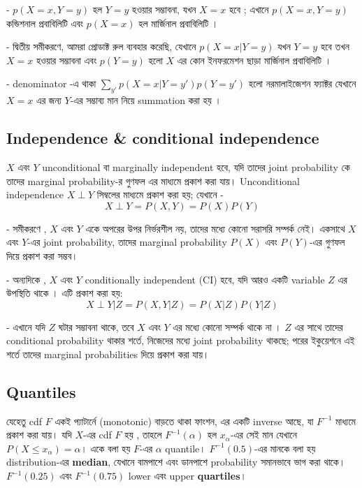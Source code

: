 \documentclass[graybox, envcountchap, twocolumn]{styles/svmult}
\begin{document}
-   {\bengalifont 
    \(p(X=x, Y=y)\) হল \(Y=y\) হওয়ার সম্ভাবনা, যখন \(X=x\) হবে ; এখানে \(p(X=x, Y=y)\)  কন্ডিশনাল প্রবাবিলিটি  এবং \(p(X=x)\) হল মার্জিনাল প্রবাবিলিটি ।  
    }

-    {\bengalifont 
    দ্বিতীয় সমীকরণে, আমরা প্রোডাক্ট রুল ব্যবহার করেছি, যেখানে \(p(X=x|Y=y)\) যখন  \(Y=y\) হবে তখন \(X=x\) হওয়ার সম্ভাবনা এবং \(p(Y=y)\) হলো $X$ এর কোন ইনফরমেশন ছাড়া  মার্জিনাল প্রবাবিলিটি ।
    }

-   {\bengalifont 
    denominator -এ থাকা \(\sum_{y'} p(X=x|Y=y') p(Y=y')\) হলো নরমালাইজেশন ফ্যাক্টর যেখানে $X = x$ এর জন্য  \(Y\)-এর সম্ভাব্য মান নিয়ে summation করা হয় । 
    }



\subsection{Independence \& conditional independence}
{\bengalifont 
\(X\) এবং \(Y\) unconditional বা marginally independent হবে, যদি তাদের joint probability কে তাদের marginal probability-র গুণফল এর মাধ্যমে প্রকাশ করা যায়। Unconditional independence \(X \perp Y\) সিম্বলের মাধ্যমে প্রকাশ করা হয়; যেখানে - }
\begin{equation}
X \perp Y = P(X,Y) = P(X)P(Y)
\end{equation}

-   {\bengalifont সমীকরণে , \(X\) এবং \(Y\) একে অপরের উপর নির্ভরশীল নয়, তাদের মধ্যে কোনো সরাসরি  সম্পর্ক নেই। একসাথে \(X\) এবং \(Y\)-এর joint probability, তাদের marginal probability \(P(X)\) এবং \(P(Y)\)-এর গুণফল দিয়ে প্রকাশ করা সম্ভব। }

-   {\bengalifont 
অন্যদিকে , \(X\) এবং \(Y\) conditionally independent (CI) হবে, যদি আরও একটি variable \(Z\) এর উপস্থিতি থাকে । এটি প্রকাশ করা হয়:}
\begin{equation}
X \perp Y|Z = P(X,Y|Z) = P(X|Z)P(Y|Z)
\end{equation}

-   {\bengalifont এখানে যদি \(Z\) ঘটার সম্ভাবনা থাকে, তবে  \(X\) এবং \(Y\) এর মধ্যে কোনো সম্পর্ক থাকে না । \(Z\) এর সাথে তাদের conditional probability থাকার শর্তে, নিজেদের মধ্যে joint probability থাকছে;  পরের ইকুয়েশনে এই শর্তে তাদের marginal probabilities দিয়ে প্রকাশ করা যায়। }


\subsection{Quantiles}
\bengalifont 
যেহেতু cdf \(F\) একই প্যাটার্নে (monotonic) বাড়তে থাকা ফাংশন, এর একটি inverse আছে, যা \(F^{-1}\) মাধ্যমে প্রকাশ করা যায়। যদি \(X\)-এর cdf \(F\) হয় , তাহলে \(F^{-1}(\alpha)\) হল \(x_{\alpha}\)-এর সেই মান যেখানে \(P(X \leq x_{\alpha}) = \alpha\)। একে বলা হয় \(F\)-এর \(\alpha\) quantile। \(F^{-1}(0.5)\)-এর মানকে বলা হয় distribution-এর \textbf{median}, যেখানে বামপাশে এবং ডানপাশে probability সমানভাবে ভাগ করা থাকে। \(F^{-1}(0.25)\) এবং \(F^{-1}(0.75)\) lower এবং upper \textbf{quartiles}।
\end{document}
